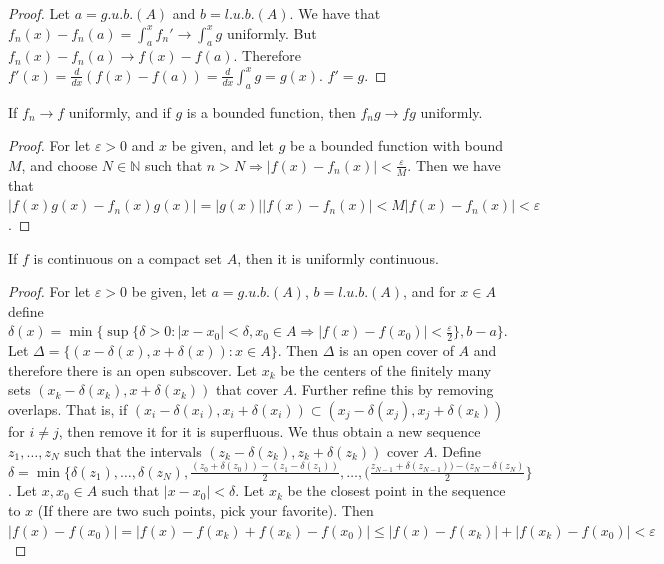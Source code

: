 \documentclass[crop=false,class=book,oneside]{standalone}
\begin{document}
            \begin{proof}
                Let $a=g.u.b.(A)$ and $b=l.u.b.(A)$. We have that $f_n(x) - f_n(a) = \int_{a}^{x}f_n' \rightarrow \int_{a}^{x}g$ uniformly. But $f_n(x)-f_n(a) \rightarrow f(x) - f(a)$. Therefore $f'(x)=\frac{d}{dx}(f(x)-f(a)) = \frac{d}{dx}\int_{a}^{x} g = g(x)$. $f' = g$.
            \end{proof}
            \begin{theorem}
                If $f_n \rightarrow f$ uniformly, and if $g$ is a bounded function, then $f_n g \rightarrow fg$ uniformly.
            \end{theorem}
            \begin{proof}
                For let $\varepsilon>0$ and $x$ be given, and let $g$ be a bounded function with bound $M$, and choose $N\in\mathbb{N}$ such that $n>N \Rightarrow |f(x)-f_n(x)|<\frac{\varepsilon}{M}$. Then we have that $|f(x)g(x)-f_n(x)g(x)| = |g(x)||f(x)-f_n(x)| < M|f(x)-f_n(x)| <\varepsilon$.
            \end{proof}
            \begin{theorem}
                If $f$ is continuous on a compact set $A$, then it is uniformly continuous.
            \end{theorem}
            \begin{proof}
                For let $\varepsilon>0$ be given, let $a=g.u.b.(A)$, $b=l.u.b.(A)$, and for $x\in A$ define $\delta(x) = \min\{\sup\{\delta>0: |x-x_0|<\delta,x_0\in A\Rightarrow |f(x)-f(x_0)|<\frac{\varepsilon}{2}\},b-a\}$. Let $\Delta = \{(x-\delta(x),x+\delta(x)):x\in A\}$. Then $\Delta$ is an open cover of $A$ and therefore there is an open subscover. Let $x_k$ be the centers of the finitely many sets $(x_k-\delta(x_k),x+\delta(x_k))$ that cover $A$. Further refine this by removing overlaps. That is, if $(x_i-\delta(x_i),x_i+\delta(x_i))\subset (x_j-\delta(x_j),x_j+\delta(x_k))$ for $i\ne j$, then remove it for it is superfluous. We thus obtain a new sequence $z_1,\hdots, z_N$ such that the intervals $(z_k-\delta(z_k),z_k+\delta(z_k))$ cover $A$. Define $\delta = \min\{\delta(z_1),\hdots,\delta(z_N), \frac{(z_0+\delta(z_0))-(z_1-\delta(z_1))}{2},\hdots,(\frac{z_{N-1}+\delta(z_{N-1}))-(z_{N}-\delta(z_{N})}{2}\}$. Let $x,x_0\in A$ such that $|x-x_0|<\delta$. Let $x_k$ be the closest point in the sequence to $x$ (If there are two such points, pick your favorite). Then $|f(x)-f(x_0)|=|f(x)-f(x_k)+f(x_k)-f(x_0)|\leq |f(x)-f(x_k)|+|f(x_k)-f(x_0)|<\varepsilon$
            \end{proof}
\end{document}
